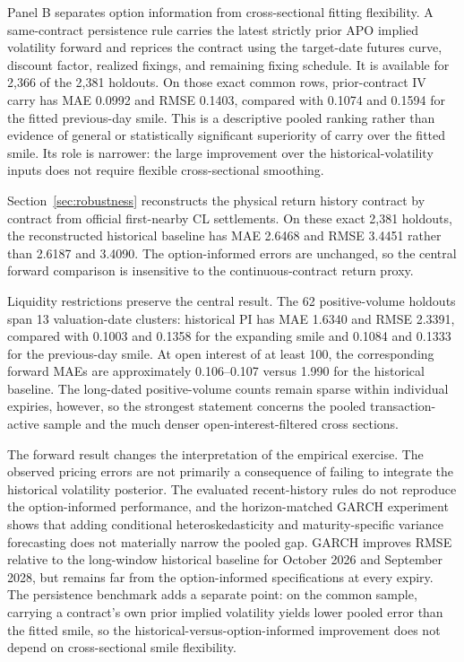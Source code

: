 Panel B separates option information from cross-sectional fitting flexibility. A same-contract persistence rule carries the latest strictly prior APO implied volatility forward and reprices the contract using the target-date futures curve, discount factor, realized fixings, and remaining fixing schedule. It is available for 2,366 of the 2,381 holdouts. On those exact common rows, prior-contract IV carry has MAE 0.0992 and RMSE 0.1403, compared with 0.1074 and 0.1594 for the fitted previous-day smile. This is a descriptive pooled ranking rather than evidence of general or statistically significant superiority of carry over the fitted smile. Its role is narrower: the large improvement over the historical-volatility inputs does not require flexible cross-sectional smoothing.

Section~\ref{sec:robustness} reconstructs the physical return history contract by contract from official first-nearby CL settlements. On these exact 2,381 holdouts, the reconstructed historical baseline has MAE 2.6468 and RMSE 3.4451 rather than 2.6187 and 3.4090. The option-informed errors are unchanged, so the central forward comparison is insensitive to the continuous-contract return proxy.

Liquidity restrictions preserve the central result. The 62 positive-volume holdouts span 13 valuation-date clusters: historical PI has MAE 1.6340 and RMSE 2.3391, compared with 0.1003 and 0.1358 for the expanding smile and 0.1084 and 0.1333 for the previous-day smile. At open interest of at least 100, the corresponding forward MAEs are approximately 0.106--0.107 versus 1.990 for the historical baseline. The long-dated positive-volume counts remain sparse within individual expiries, however, so the strongest statement concerns the pooled transaction-active sample and the much denser open-interest-filtered cross sections.

The forward result changes the interpretation of the empirical exercise. The observed pricing errors are not primarily a consequence of failing to integrate the historical volatility posterior. The evaluated recent-history rules do not reproduce the option-informed performance, and the horizon-matched GARCH experiment shows that adding conditional heteroskedasticity and maturity-specific variance forecasting does not materially narrow the pooled gap. GARCH improves RMSE relative to the long-window historical baseline for October 2026 and September 2028, but remains far from the option-informed specifications at every expiry. The persistence benchmark adds a separate point: on the common sample, carrying a contract's own prior implied volatility yields lower pooled error than the fitted smile, so the historical-versus-option-informed improvement does not depend on cross-sectional smile flexibility.


